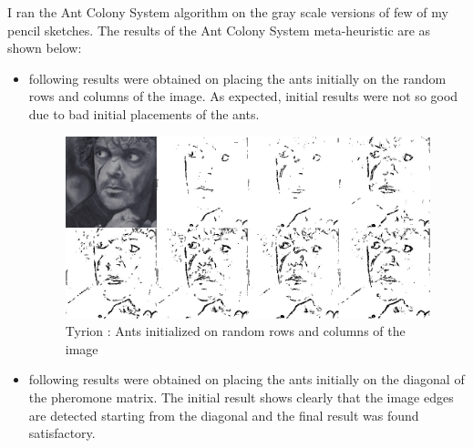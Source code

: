 \documentclass[paper=a4, fontsize=11pt]{scrartcl}
\numberwithin{equation}{section}		%
\numberwithin{figure}{section}			%
\numberwithin{table}{section}				%
\begin{document}
I ran the Ant Colony System algorithm on the gray scale versions of few of my pencil sketches. The results of the Ant Colony System meta-heuristic are as shown below: 
\begin{itemize}
	\item following results were obtained on placing the ants initially on the random  rows and columns of the image. As expected, initial results were not so good due to bad initial placements of the ants. 
	\begin{figure}[h!]
	\centering     
	\includegraphics[scale=0.35]{tyrionMixed.jpg}
          \caption{Tyrion : Ants initialized on random rows and columns of the image}
	\end{figure}
	\item following results were obtained on placing the ants initially on the diagonal of the pheromone matrix. The initial result shows clearly that the image edges are detected starting from the diagonal  and the final result was found satisfactory.
    

\end{itemize}
\end{document}
